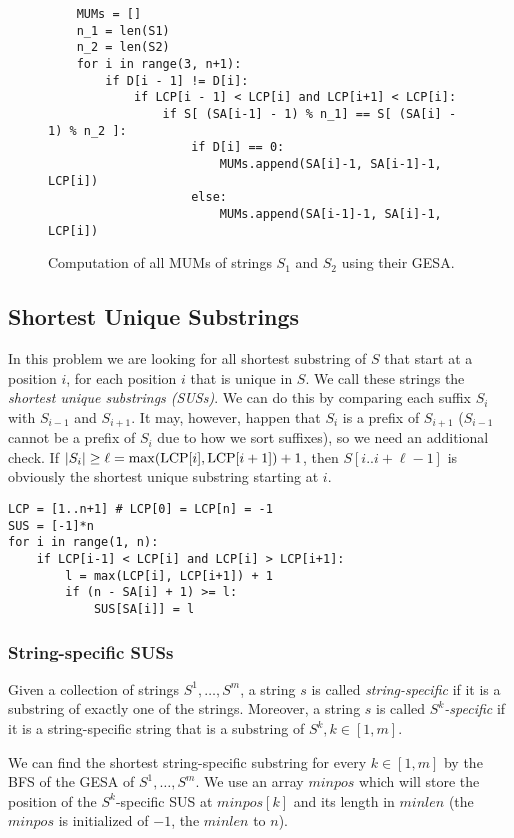 \begin{figure}[!ht]
    \centering
    \begin{verbatim}
    MUMs = []
    n_1 = len(S1)
    n_2 = len(S2)
    for i in range(3, n+1):
        if D[i - 1] != D[i]:
            if LCP[i - 1] < LCP[i] and LCP[i+1] < LCP[i]:
                if S[ (SA[i-1] - 1) % n_1] == S[ (SA[i] - 1) % n_2 ]:
                    if D[i] == 0:
                        MUMs.append(SA[i]-1, SA[i-1]-1, LCP[i])
                    else:
                        MUMs.append(SA[i-1]-1, SA[i]-1, LCP[i])
    \end{verbatim}
    \caption{Computation of all MUMs of strings $S_1$ and $S_2$ using their GESA.}
    \label{alg:MUMSA}
\end{figure}

\subsection{Shortest Unique Substrings}
\label{sec:SUSSA}
In this problem we are looking for all shortest substring of $S$ that start at a position $i$, for each position $i$ that is unique in $S$.
We call these strings the \textit{shortest unique substrings (SUSs)}.
We can do this by comparing each suffix $S_i$ with $S_{i-1}$ and $S_{i+1}$.
It may, however, happen that $S_i$ is a prefix of $S_{i+1}$ ($S_{i-1}$ cannot be a prefix of $S_i$ due to how we sort suffixes), so we need an additional check.
If $|S_i| \geq \ell = \max(\text{LCP}[i], \text{LCP}[i+1]) + 1$, then $S[i..i+\ell - 1]$ is obviously the shortest unique substring starting at $i$.


\begin{verbatim}
LCP = [1..n+1] # LCP[0] = LCP[n] = -1
SUS = [-1]*n
for i in range(1, n):
    if LCP[i-1] < LCP[i] and LCP[i] > LCP[i+1]:
        l = max(LCP[i], LCP[i+1]) + 1
        if (n - SA[i] + 1) >= l:
            SUS[SA[i]] = l
\end{verbatim}

\subsubsection{String-specific SUSs}
Given a collection of strings $S^1, \ldots, S^m$, a string $s$ is called \textit{string-specific} if it is a substring of exactly one of the strings.
Moreover, a string $s$ is called \textit{$S^k$-specific} if it is a string-specific string that is a substring of
$S^k, k \in [1, m]$.

We can find the shortest string-specific substring for every $k \in [1, m]$ by the BFS of the GESA of $S^1, \ldots, S^m$.
We use an array $minpos$ which will store the position of the $S^k$-specific SUS at $minpos[k]$ and its length in $minlen$ (the $minpos$ is initialized of $-1$, the $minlen$ to $n$).

